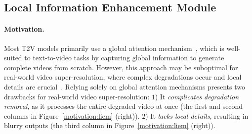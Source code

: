 \subsection{Local Information Enhancement Module}
\label{subsec:LIEM}

\paragraph{Motivation.} 
%
Most T2V models primarily use a global attention mechanism~\cite{liu2021global}, which is well-suited to text-to-video tasks by capturing global information to generate complete videos from scratch. 
However, this approach may be suboptimal for real-world video super-resolution, where complex degradations occur and local details are crucial~\cite{kong2022residual}.
%
Relying solely on global attention mechanisms presents two drawbacks for real-world video super-resolution: 
$1$) It \textit{complicates degradation removal}, as it processes the entire degraded video at once (the first and second columns in Figure~\ref{motivation:liem} (right)).
$2$) It \textit{lacks local details}, resulting in blurry outputs (the third column in Figure~\ref{motivation:liem} (right)). 


\vspace{-1em}

